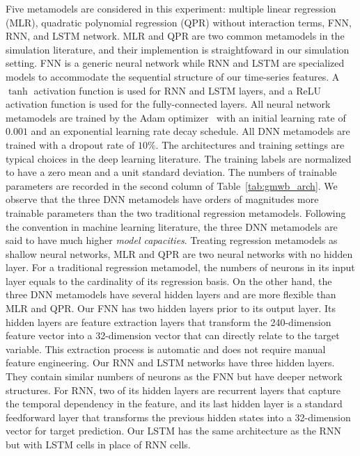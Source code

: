 Five metamodels are considered in this experiment: multiple linear regression (MLR), quadratic polynomial regression (QPR) without interaction terms, FNN, RNN, and LSTM network.
MLR and QPR are two common metamodels in the simulation literature, and their implemention is straightfoward in our simulation setting.
FNN is a generic neural network while RNN and LSTM are specialized models to accommodate the sequential structure of our time-series features.
A $\tanh$ activation function is used for RNN and LSTM layers, and a ReLU activation function is used for the fully-connected layers.
All neural network metamodels are trained by the Adam optimizer~\citep{kingma2014adam} with an initial learning rate of $0.001$ and an exponential learning rate decay schedule.
All DNN metamodels are trained with a dropout rate of $10\%$.
The architectures and training settings are typical choices in the deep learning literature.
The training labels are normalized to have a zero mean and a unit standard deviation.
The numbers of trainable parameters are recorded in the second column of Table~\ref{tab:gmwb_arch}.
We observe that the three DNN metamodels have orders of magnitudes more trainable parameters than the two traditional regression metamodels.
Following the convention in machine learning literature, the three DNN metamodels are said to have much higher \textit{model capacities}.
Treating regression metamodels as shallow neural networks, MLR and QPR are two neural networks with no hidden layer. 
For a traditional regression metamodel, the numbers of neurons in its input layer equals to the cardinality of its regression basis.
On the other hand, the three DNN metamodels have several hidden layers and are more flexible than MLR and QPR.
Our FNN has two hidden layers prior to its output layer.
Its hidden layers are feature extraction layers that transform the 240-dimension feature vector into a 32-dimension vector that can directly relate to the target variable.
This extraction process is automatic and does not require manual feature engineering.
Our RNN and LSTM networks have three hidden layers.
They contain similar numbers of neurons as the FNN but have deeper network structures.
For RNN, two of its hidden layers are recurrent layers that capture the temporal dependency in the feature, and its last hidden layer is a standard feedforward layer that transforms the previous hidden states into a 32-dimension vector for target prediction.
Our LSTM has the same architecture as the RNN but with LSTM cells in place of RNN cells.

